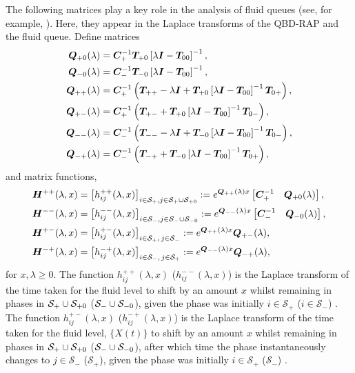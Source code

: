The following matrices play a key role in the analysis of fluid queues (see, for example, \cite{bean2009}). Here, they appear in the Laplace transforms of the QBD-RAP and the fluid queue. Define matrices
\begin{align*}
	\boldsymbol Q_{+0}(\lambda) &= \boldsymbol C_+^{-1}\boldsymbol T_{+0}\left[\lambda \boldsymbol I - \boldsymbol T_{00}\right]^{-1},
	\\\boldsymbol Q_{-0}(\lambda) &= \boldsymbol C_-^{-1}\boldsymbol T_{-0}\left[\lambda \boldsymbol I - \boldsymbol T_{00}\right]^{-1},
	\\\boldsymbol Q_{++}(\lambda) &= \boldsymbol C_+^{-1} \left(\boldsymbol T_{++} - \lambda \boldsymbol I + \boldsymbol T_{+0}\left[\lambda \boldsymbol I - \boldsymbol T_{00}\right]^{-1}\boldsymbol T_{0+}\right),
	\\\boldsymbol Q_{+-}(\lambda) &= \boldsymbol C_+^{-1} \left(\boldsymbol T_{+-} + \boldsymbol T_{+0}\left[\lambda \boldsymbol I - \boldsymbol T_{00}\right]^{-1}\boldsymbol T_{0-} \right) ,
	\\\boldsymbol Q_{--}(\lambda) &= \boldsymbol C_-^{-1} \left(\boldsymbol T_{--}  - \lambda \boldsymbol I + \boldsymbol T_{-0}\left[\lambda \boldsymbol I - \boldsymbol T_{00}\right]^{-1}\boldsymbol T_{0-}\right),
	\\\boldsymbol Q_{-+}(\lambda) &=\boldsymbol C_-^{-1} \left(\boldsymbol T_{-+}+ \boldsymbol T_{-0}\left[\lambda \boldsymbol I - \boldsymbol T_{00}\right]^{-1}\boldsymbol T_{0+}\right) ,
\end{align*}
and matrix functions,
\begin{align}
	\boldsymbol H^{++}(\lambda,x)&= \left[h_{ij}^{++}(\lambda,x)\right]_{i\in \mathcal S_+,j\in\mathcal S_{+}\cup\mathcal{S}_{+0}} := e^{\boldsymbol{Q}_{++}(\lambda)x}\begin{bmatrix} \boldsymbol C_+^{-1} & \boldsymbol Q_{+0}(\lambda) \end{bmatrix},  \label{eqn: lst 1}
	\\\boldsymbol H^{--}(\lambda,x) &= \left[h_{ij}^{--}(\lambda,x)\right]_{i\in\mathcal S_-,j\in\mathcal S_{-}\cup\mathcal{S}_{-0}}:= e^{\boldsymbol{Q}_{--}(\lambda)x}\begin{bmatrix} \boldsymbol C_-^{-1} & \boldsymbol Q_{-0}(\lambda) \end{bmatrix},
	\\\boldsymbol H^{+-}(\lambda,x)  &= \left[h_{ij}^{+-}(\lambda,x)\right]_{i\in\mathcal S_+,\,j\in\mathcal S_-}:= e^{\boldsymbol{Q}_{++}(\lambda)x}\boldsymbol{Q}_{+-}(\lambda), 
	\\\boldsymbol H^{-+}(\lambda,x)&= \left[h_{ij}^{-+}(\lambda,x)\right]_{i\in\mathcal S_-,\, j\in\mathcal S_+} := e^{\boldsymbol{Q}_{--}(\lambda)x}\boldsymbol{Q}_{-+}(\lambda) , \label{eqn: lst 4}
\end{align}
for \(x,\lambda\geq 0\). The function \(h_{ij}^{++}(\lambda,x)\) (\(h_{ij}^{--}(\lambda,x)\)) is the Laplace transform of the time taken for the fluid level to shift by an amount \(x\) whilst remaining in phases in \(\mathcal S_+\cup\mathcal{S}_{+0}\) (\(\mathcal S_-\cup\mathcal{S}_{-0}\)), given the phase was initially \(i\in\mathcal S_+\) (\(i\in\mathcal S_-\)) \citep{bean2005}. The function \(h_{ij}^{+-}(\lambda,x)\) (\(h_{ij}^{-+}(\lambda,x)\)) is the Laplace transform of the time taken for the fluid level, \(\{X(t)\}\) to shift by an amount \(x\) whilst remaining in phases in \(\mathcal S_+\cup\mathcal{S}_{+0}\) (\(\mathcal S_-\cup\mathcal{S}_{-0}\)), after which time the phase instantaneously changes to \(j\in\mathcal S_-\) (\(\mathcal S_+\)), given the phase was initially \(i\in\mathcal S_+\) (\(\mathcal S_-\)) \citep{bean2005}.

